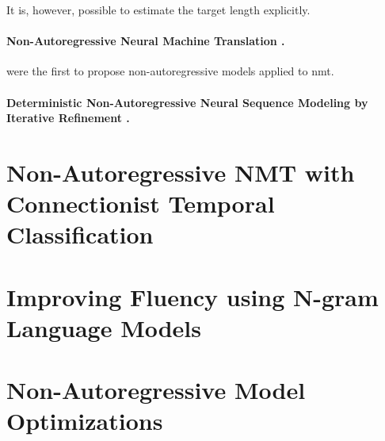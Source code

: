 It is, however, possible to estimate the target length explicitly. 





\paragraph{Non-Autoregressive Neural Machine Translation \citep{gu2017nonautoregressive}.}

\citet{gu2017nonautoregressive} were the first to propose non-autoregressive
models applied to \gls{nmt}.

\paragraph{Deterministic Non-Autoregressive Neural Sequence Modeling by Iterative Refinement \citep{lee2018deterministic}.}


\citep{ghazvininejad2019mask} \citep{mansimov2019generalized}


\section{Non-Autoregressive NMT with Connectionist Temporal Classification}
\label{sec:nat-ctc}



\section{Improving Fluency using N-gram Language Models}
\label{sec:nat-lm}


\section{Non-Autoregressive Model Optimizations}
\label{sec:nat-opt}



